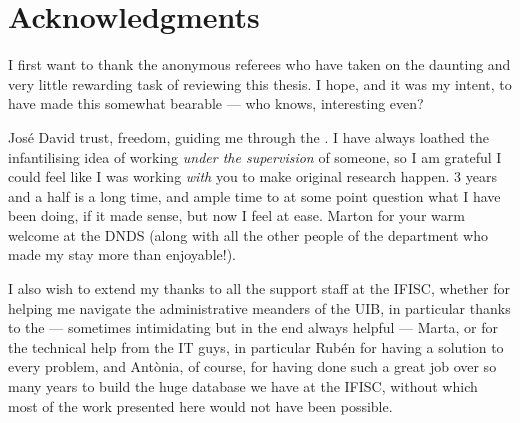 \documentclass[../thesis.tex]{subfiles}
\begin{document}

\begingroup
\let\clearpage\relax
\let\cleardoublepage\relax
\let\cleardoublepage\relax
\chapter*{Acknowledgments}

I first want to thank the anonymous referees who have taken on the daunting and very little rewarding task of reviewing this thesis.
I hope, and it was my intent, to have made this somewhat bearable --- who knows, interesting even?

José David
trust, freedom, guiding me through the .
I have always loathed the infantilising idea of working \emph{under the supervision} of someone, so I am grateful I could feel like I was working \emph{with} you to make original research happen.
3 years and a half is a long time, and ample time to at some point question what I have been doing, if it made sense, but now I feel at ease.
Marton for your warm welcome at the DNDS (along with all the other people of the department who made my stay more than enjoyable!).

I also wish to extend my thanks to all the support staff at the IFISC, whether for helping me navigate the administrative meanders of the UIB, in particular thanks to the --- sometimes intimidating  but in the end always helpful --- Marta, or for the technical help from the IT guys, in particular Rubén for having a solution to every problem, and Antònia, of course, for having done such a great job over so many years to build the huge database we have at the IFISC, without which most of the work presented here would not have been possible.

\end{document}
